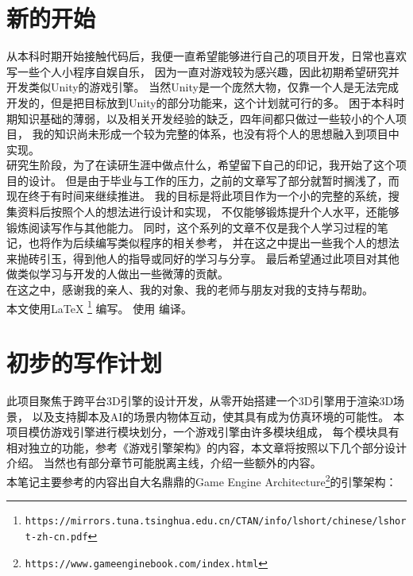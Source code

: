 \section{新的开始}

从本科时期开始接触代码后，我便一直希望能够进行自己的项目开发，日常也喜欢写一些个人小程序自娱自乐，
因为一直对游戏较为感兴趣，因此初期希望研究并开发类似Unity的游戏引擎。
当然Unity是一个庞然大物，仅靠一个人是无法完成开发的，但是把目标放到Unity的部分功能来，这个计划就可行的多。
困于本科时期知识基础的薄弱，以及相关开发经验的缺乏，四年间都只做过一些较小的个人项目，
我的知识尚未形成一个较为完整的体系，也没有将个人的思想融入到项目中实现。\\

研究生阶段，为了在读研生涯中做点什么，希望留下自己的印记，我开始了这个项目的设计。
但是由于毕业与工作的压力，之前的文章写了部分就暂时搁浅了，而现在终于有时间来继续推进。
我的目标是将此项目作为一个小的完整的系统，搜集资料后按照个人的想法进行设计和实现，
不仅能够锻炼提升个人水平，还能够锻炼阅读写作与其他能力。
同时，这个系列的文章不仅是我个人学习过程的笔记，也将作为后续编写类似程序的相关参考，
并在这之中提出一些我个人的想法来抛砖引玉，得到他人的指导或同好的学习与分享。
最后希望通过此项目对其他做类似学习与开发的人做出一些微薄的贡献。\\

在这之中，感谢我的亲人、我的对象、我的老师与朋友对我的支持与帮助。\\

本文使用\LaTeX{} \footnote{\nolinkurl{https://mirrors.tuna.tsinghua.edu.cn/CTAN/info/lshort/chinese/lshort-zh-cn.pdf}} 编写。
使用\XeLaTeX{} 编译。

\maketitle
\section{初步的写作计划}

此项目聚焦于跨平台3D引擎的设计开发，从零开始搭建一个3D引擎用于渲染3D场景，
以及支持脚本及AI的场景内物体互动，使其具有成为仿真环境的可能性。
本项目模仿游戏引擎进行模块划分，一个游戏引擎由许多模块组成，
每个模块具有相对独立的功能，参考《游戏引擎架构》的内容，本文章将按照以下几个部分设计介绍。
当然也有部分章节可能脱离主线，介绍一些额外的内容。\\

本笔记主要参考的内容出自大名鼎鼎的Game Engine Architecture\footnote{\nolinkurl{https://www.gameenginebook.com/index.html}}的引擎架构：

